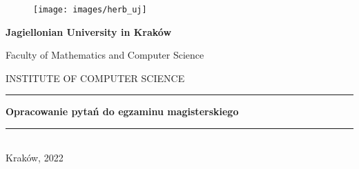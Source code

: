\begin{titlepage}

    \begin{figure}
        \centering
        \texttt{[image: images/herb\_uj]}
    \end{figure}

    \begin{center}

        \renewcommand{\baselinestretch}{1}
        \large{\textbf{Jagiellonian University in Kraków}}
        \smallskip

        \normalsize{Faculty of Mathematics and Computer Science}
        \smallskip

        \small{INSTITUTE OF COMPUTER SCIENCE}
        \renewcommand{\baselinestretch}{1.5}

        \vspace{1cm}

        \vspace{1cm}
        \hrule
        \vspace{1cm}

        \renewcommand{\baselinestretch}{1}
        \LARGE{\textbf{Opracowanie pytań do egzaminu magisterskiego}}
        \renewcommand{\baselinestretch}{1.5}

        \vspace{1cm}
        \hrule
        \vspace{1cm}

    \end{center}
    
    \bigskip
    \bigskip

    \renewcommand{\arraystretch}{0.85}
    \begin{tabularx}{0.7\textwidth}{
        >{\raggedright\arraybackslash}X
        >{\raggedright\arraybackslash}X }
%
    \end{tabularx}

    \vfill

    \begin{center}
        \normalsize{Kraków, 2022}
    \end{center}

\end{titlepage}
